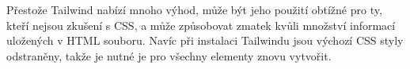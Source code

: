 Přestože Tailwind nabízí mnoho výhod, může být jeho použití obtížné pro ty, kteří nejsou zkušení s CSS, a může způsobovat zmatek kvůli množství informací uložených v HTML souboru.
Navíc při instalaci Tailwindu jsou výchozí CSS styly odstraněny, takže je nutné je pro všechny elementy znovu vytvořit.

